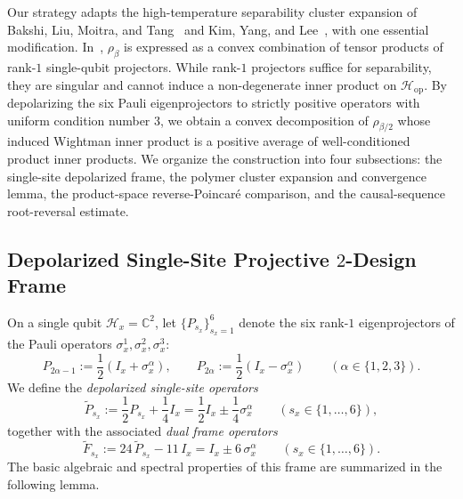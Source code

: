 \documentclass[11pt,a4paper]{article}
\numberwithin{equation}{section}
\theoremstyle{plain}
\theoremstyle{definition}
\newcommand{\Hop}{\mathcal{H}_{\mathrm{op}}}
\begin{document}
Our strategy adapts the high-temperature separability cluster expansion of Bakshi, Liu, Moitra, and Tang~\cite{Bakshi2024} and Kim, Yang, and Lee~\cite{Kim2026}, with one essential modification. In~\cite{Bakshi2024,Kim2026}, $\rho_\beta$ is expressed as a convex combination of tensor products of rank-$1$ single-qubit projectors. While rank-$1$ projectors suffice for separability, they are singular and cannot induce a non-degenerate inner product on $\Hop$. By depolarizing the six Pauli eigenprojectors to strictly positive operators with uniform condition number $3$, we obtain a convex decomposition of $\rho_{\beta/2}$ whose induced Wightman inner product is a positive average of well-conditioned product inner products. We organize the construction into four subsections: the single-site depolarized frame, the polymer cluster expansion and convergence lemma, the product-space reverse-Poincar\'e comparison, and the causal-sequence root-reversal estimate.

\subsection{Depolarized Single-Site Projective $2$-Design Frame}\label{subsec:2design-frame}

On a single qubit $\mathcal{H}_x = \mathbb{C}^2$, let $\{P_{s_x}\}_{s_x=1}^6$ denote the six rank-$1$ eigenprojectors of the Pauli operators $\sigma_x^1,\sigma_x^2,\sigma_x^3$:
\[
  P_{2\alpha-1} := \frac{1}{2}(I_x + \sigma_x^\alpha), \qquad
  P_{2\alpha} := \frac{1}{2}(I_x - \sigma_x^\alpha) \qquad (\alpha\in\{1,2,3\}).
\]
We define the \emph{depolarized single-site operators}
\begin{equation}\label{eq:Ptilde-def}
  \widetilde{P}_{s_x} := \frac{1}{2} P_{s_x} + \frac{1}{4} I_x
  = \frac{1}{2} I_x \pm \frac{1}{4}\sigma_x^\alpha \qquad (s_x\in\{1,\dots,6\}),
\end{equation}
together with the associated \emph{dual frame operators}
\begin{equation}\label{eq:Ftilde-def}
  \widetilde{F}_{s_x} := 24\,\widetilde{P}_{s_x} - 11\,I_x
  = I_x \pm 6\,\sigma_x^\alpha \qquad (s_x\in\{1,\dots,6\}).
\end{equation}
The basic algebraic and spectral properties of this frame are summarized in the following lemma.
\end{document}
